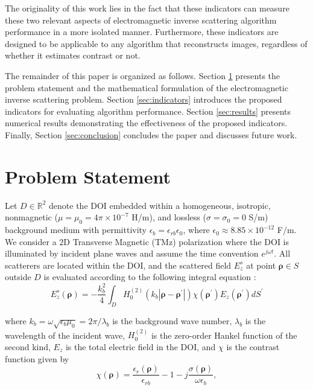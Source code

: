 \documentclass{IEEEtran}
\newcommand{\brho}{\boldsymbol{\rho}}
\newcommand{\brhop}{\boldsymbol{\rho^\prime}}
\begin{document}
        The originality of this work lies in the fact that these indicators can measure these two relevant aspects of electromagnetic inverse scattering algorithm performance in a more isolated manner. Furthermore, these indicators are designed to be applicable to any algorithm that reconstructs images, regardless of whether it estimates contrast or not.


        The remainder of this paper is organized as follows. Section \ref{sec:problemstatement} presents the problem statement and the mathematical formulation of the electromagnetic inverse scattering problem. Section \ref{sec:indicators} introduces the proposed indicators for evaluating algorithm performance. Section \ref{sec:results} presents numerical results demonstrating the effectiveness of the proposed indicators. Finally, Section \ref{sec:conclusion} concludes the paper and discusses future work.
        
	\section{Problem Statement}\label{sec:problemstatement}
		
		Let $D \in \mathbb{R}^2$ denote the DOI embedded within a homogeneous, isotropic, nonmagnetic ($\mu = \mu_0 = 4\pi \times 10^{-7}$ H/m), and lossless ($\sigma = \sigma_0 = 0$ S/m) background medium with permittivity $\epsilon_b = \epsilon_{rb}\epsilon_0$, where $\epsilon_0 \approx 8.85 \times 10^{-12}$ F/m. We consider a 2D Transverse Magnetic (TMz) polarization where the DOI is illuminated by incident plane waves and assume the time convention $e^{j\omega t}$. All scatterers are located within the DOI, and the scattered field $E^s_z$ at point $\brho \in S$ outside $D$ is evaluated according to the following integral equation \cite{harrington2001time}:
		\begin{equation}
			E^s_z (\brho) = -\frac{k_b^2}{4} \int_D H_0^{(2)}(k_b|\brho-\brhop|)\chi(\brhop)E_z(\brhop) dS^\prime
		\end{equation}
		
		\noindent where $k_b = \omega\sqrt{\epsilon_b\mu_0} = 2\pi/\lambda_b$ is the background wave number, $\lambda_b$ is the wavelength of the incident wave, $H_0^{(2)}$ is the zero-order Hankel function of the second kind, $E_z$ is the total electric field in the DOI, and $\chi$ is the contrast function given by
		\begin{equation}
			\chi(\brho) = \frac{\epsilon_r(\brho)}{\epsilon_{rb}} - 1 - j\frac{\sigma(\brho)}{\omega\epsilon_b},
		\end{equation}
		
\end{document}
